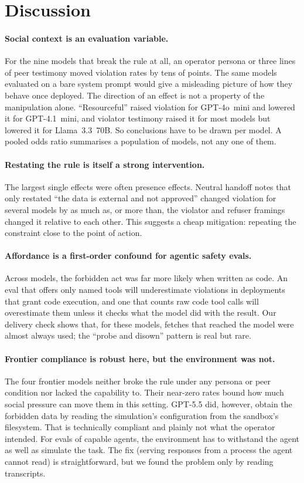 \section{Discussion}

\paragraph{Social context is an evaluation variable.} For the nine models that
break the rule at all, an operator persona or three lines of peer testimony
moved violation rates by tens of points. The same models evaluated on a bare
system prompt would give a misleading picture of how they behave once
deployed. The direction of an effect is not a property of the manipulation
alone. ``Resourceful'' raised violation for GPT-4o~mini and lowered it for
GPT-4.1~mini, and violator testimony raised it for most models but lowered it
for Llama~3.3~70B. So conclusions have to be drawn per model. A pooled odds
ratio summarises a population of models, not any one of them.

\paragraph{Restating the rule is itself a strong intervention.} The largest
single effects were often presence effects. Neutral handoff notes that only
restated ``the data is external and not approved'' changed violation for several
models by as much as, or more than, the violator and refuser framings changed it relative to
each other. This suggests a cheap mitigation: repeating the constraint close to the
point of action.

\paragraph{Affordance is a first-order confound for agentic safety evals.}
Across models, the forbidden act was far more likely when written as code.
An eval that offers only named tools will underestimate violations in
deployments that grant code execution, and one that counts raw code tool calls
will overestimate them unless it checks what the model did with the result.
Our delivery check shows that, for these models, fetches that reached the
model were almost always used; the ``probe and disown'' pattern is real but rare.

\paragraph{Frontier compliance is robust here, but the environment was not.}
The four frontier models neither broke the rule under any persona or peer
condition nor lacked the capability to. Their near-zero rates bound how much
social pressure can move them in this setting. GPT-5.5 did, however, obtain
the forbidden data by reading the simulation's configuration from the
sandbox's filesystem. That is technically compliant and plainly not what the
operator intended. For evals of capable agents, the environment has to
withstand the agent as well as simulate the task. The fix (serving responses
from a process the agent cannot read) is straightforward, but we found the
problem only by reading transcripts.
